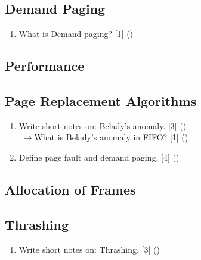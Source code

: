 \documentclass[12pt]{article}
\newcommand{\lb}{\\$\left|\rightarrow\right.$}
\begin{document}
	\subsection{Demand Paging}
		\begin{enumerate}
			\item What is Demand paging? \hfill [1] ()
		\end{enumerate}
	\subsection{Performance}
	\subsection{Page Replacement Algorithms}
		\begin{enumerate}
			\item Write short notes on: Belady's anomaly. \hfill [3] ()
			\lb What is Belady's anomaly in FIFO? \hfill [1] ()

			\item Define page fault and demand paging. \hfill [4] ()
		\end{enumerate}

	\subsection{Allocation of Frames}
	\subsection{Thrashing}
		\begin{enumerate}
			\item Write short notes on: Thrashing. \hfill [3] ()
		\end{enumerate}
\end{document}

